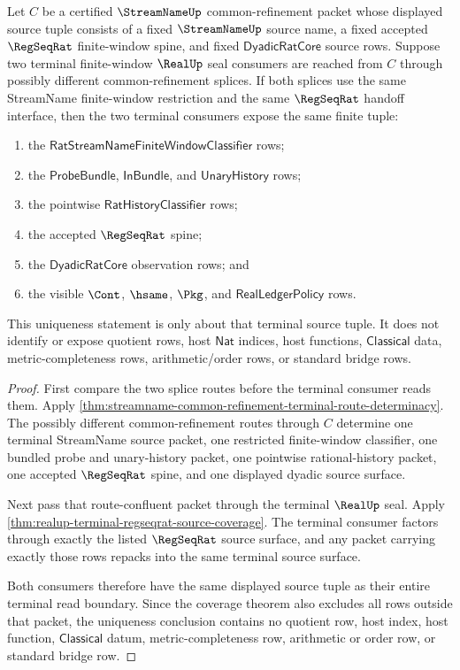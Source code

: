 \begin{theorem}
\label{thm:realup-terminal-common-refinement-splice-uniqueness}
Let $C$ be a certified $\StreamNameUp$ common-refinement packet whose displayed
source tuple consists of a fixed $\StreamNameUp$ source name, a fixed accepted
$\RegSeqRat$ finite-window spine, and fixed $\mathsf{DyadicRatCore}$ source
rows. Suppose two terminal finite-window $\RealUp$ seal consumers are reached
from $C$ through possibly different common-refinement splices. If both splices
use the same StreamName finite-window restriction and the same $\RegSeqRat$
handoff interface, then the two terminal consumers expose the same finite
tuple:
\begin{enumerate}
  \item the $\mathsf{RatStreamNameFiniteWindowClassifier}$ rows;
  \item the $\mathsf{ProbeBundle}$, $\mathsf{InBundle}$, and
  $\mathsf{UnaryHistory}$ rows;
  \item the pointwise $\mathsf{RatHistoryClassifier}$ rows;
  \item the accepted $\RegSeqRat$ spine;
  \item the $\mathsf{DyadicRatCore}$ observation rows; and
  \item the visible $\Cont$, $\hsame$, $\Pkg$, and
  $\mathsf{RealLedgerPolicy}$ rows.
\end{enumerate}
This uniqueness statement is only about that terminal source tuple. It does
not identify or expose quotient rows, host $\mathsf{Nat}$ indices, host
functions, $\mathsf{Classical}$ data, metric-completeness rows,
arithmetic/order rows, or standard bridge rows.
\end{theorem}
\begin{proof}
First compare the two splice routes before the terminal consumer reads them.
Apply
\autoref{thm:streamname-common-refinement-terminal-route-determinacy}. The
possibly different common-refinement routes through $C$ determine one terminal
StreamName source packet, one restricted finite-window classifier, one bundled
probe and unary-history packet, one pointwise rational-history packet, one
accepted $\RegSeqRat$ spine, and one displayed dyadic source surface.

Next pass that route-confluent packet through the terminal $\RealUp$ seal.
Apply \autoref{thm:realup-terminal-regseqrat-source-coverage}. The terminal
consumer factors through exactly the listed $\RegSeqRat$ source surface, and
any packet carrying exactly those rows repacks into the same terminal source
surface.

Both consumers therefore have the same displayed source tuple as their entire
terminal read boundary. Since the coverage theorem also excludes all rows
outside that packet, the uniqueness conclusion contains no quotient row, host
index, host function, $\mathsf{Classical}$ datum, metric-completeness row,
arithmetic or order row, or standard bridge row.
\end{proof}

